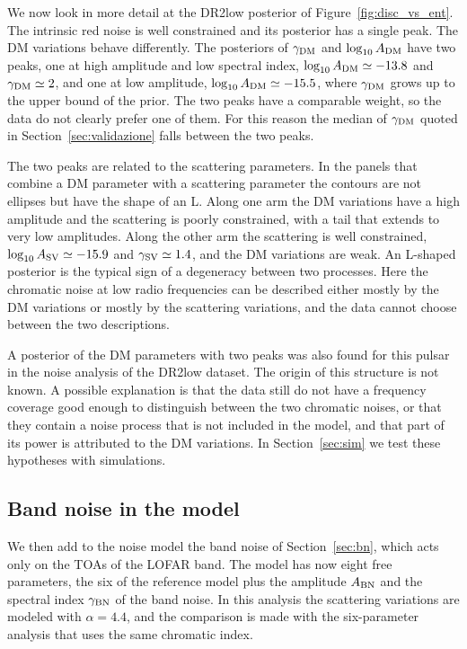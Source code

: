 We now look in more detail at the DR2low posterior of
Figure~\ref{fig:disc_vs_ent}. The intrinsic red noise is well constrained
and its posterior has a single peak. The DM variations behave differently.
The posteriors of $\gamma_{\rm DM}$ and $\log_{10}A_{\rm DM}$ have two
peaks, one at high amplitude and low spectral index,
$\log_{10}A_{\rm DM} \simeq -13.8$ and $\gamma_{\rm DM} \simeq 2$, and one
at low amplitude, $\log_{10}A_{\rm DM} \simeq -15.5$, where
$\gamma_{\rm DM}$ grows up to the upper bound of the prior. The two peaks
have a comparable weight, so the data do not clearly prefer one of them.
For this reason the median of $\gamma_{\rm DM}$ quoted in
Section~\ref{sec:validazione} falls between the two peaks.

The two peaks are related to the scattering parameters. In the panels that
combine a DM parameter with a scattering parameter the contours are not
ellipses but have the shape of an L. Along one arm the DM variations have
a high amplitude and the scattering is poorly constrained, with a tail
that extends to very low amplitudes. Along the other arm the scattering is
well constrained, $\log_{10}A_{\rm SV} \simeq -15.9$ and
$\gamma_{\rm SV} \simeq 1.4$, and the DM variations are weak. An L-shaped
posterior is the typical sign of a degeneracy between two processes. Here
the chromatic noise at low radio frequencies can be described either
mostly by the DM variations or mostly by the scattering variations, and
the data cannot choose between the two descriptions.

A posterior of the DM parameters with two peaks was also found for this
pulsar in the noise analysis of the DR2low dataset. The origin of this
structure is not known. A possible explanation is that the data still do
not have a frequency coverage good enough to distinguish between the two
chromatic noises, or that they contain a noise process that is not included
in the model, and that part of its power is attributed to the DM
variations. In Section~\ref{sec:sim} we test these hypotheses with
simulations.

\subsection{Band noise in the model} \label{sec:bn_reali}

We then add to the noise model the band noise of Section~\ref{sec:bn},
which acts only on the TOAs of the LOFAR band. The model has now eight free
parameters, the six of the reference model plus the amplitude
$A_{\rm BN}$ and the spectral index $\gamma_{\rm BN}$ of the band noise. In
this analysis the scattering variations are modeled with $\alpha = 4.4$,
and the comparison is made with the six-parameter analysis that uses the
same chromatic index.

